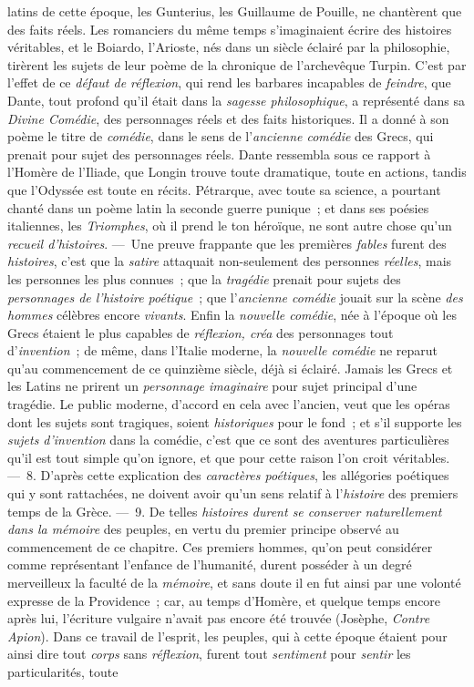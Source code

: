 \documentclass[french,twoside]{book} %
\begin{document}
latins de cette époque, les Gunterius, les  Guillaume de Pouille, ne chantèrent que des faits réels. Les romanciers du même temps s’imaginaient écrire des histoires véritables, et le Boiardo, l’Arioste, nés dans un siècle éclairé par la philosophie, tirèrent les sujets de leur poème de la chronique de l’archevêque Turpin. C’est par l’effet de ce {\itshape défaut de réflexion}, qui rend les barbares incapables de {\itshape feindre}, que Dante, tout profond qu’il était dans la {\itshape sagesse philosophique}, a représenté dans sa {\itshape Divine Comédie}, des personnages réels et des faits historiques. Il a donné à son poème le titre de {\itshape comédie}, dans le sens de l’{\itshape ancienne comédie} des Grecs, qui prenait pour sujet des personnages réels. Dante ressembla sous ce rapport à l’Homère de l’Iliade, que Longin trouve toute dramatique, toute en actions, tandis que l’Odyssée est toute en récits. Pétrarque, avec toute sa science, a pourtant chanté dans un poème latin la seconde guerre punique ; et dans ses poésies italiennes, les {\itshape Triomphes}, où il prend le ton héroïque, ne sont autre chose qu’un {\itshape recueil d’histoires}. — Une preuve frappante que les premières {\itshape fables} furent des {\itshape histoires}, c’est que la {\itshape satire} attaquait non-seulement des personnes {\itshape réelles}, mais les personnes les plus connues ; que la {\itshape tragédie} prenait pour sujets des {\itshape personnages de l’histoire poétique} ; que l’{\itshape ancienne comédie} jouait sur la scène {\itshape des hommes} célèbres encore {\itshape vivants}. Enfin la {\itshape nouvelle comédie}, née à l’époque où les Grecs étaient le plus capables de {\itshape réflexion, créa} des personnages tout d’{\itshape invention} ; de même, dans l’Italie moderne, la  {\itshape nouvelle comédie} ne reparut qu’au commencement de ce quinzième siècle, déjà si éclairé. Jamais les Grecs et les Latins ne prirent un {\itshape personnage imaginaire} pour sujet principal d’une tragédie. Le public moderne, d’accord en cela avec l’ancien, veut que les opéras dont les sujets sont tragiques, soient {\itshape historiques} pour le fond ; et s’il supporte les {\itshape sujets d’invention} dans la comédie, c’est que ce sont des aventures particulières qu’il est tout simple qu’on ignore, et que pour cette raison l’on croit véritables. — 8. D’après cette explication des {\itshape caractères poétiques}, les allégories poétiques qui y sont rattachées, ne doivent avoir qu’un sens relatif à l’{\itshape histoire} des premiers temps de la Grèce. — 9. De telles {\itshape histoires durent se conserver naturellement dans la mémoire} des peuples, en vertu du premier principe observé au commencement de ce chapitre. Ces premiers hommes, qu’on peut considérer comme représentant l’enfance de l’humanité, durent posséder à un degré merveilleux la faculté de la {\itshape mémoire}, et sans doute il en fut ainsi par une volonté expresse de la Providence ; car, au temps d’Homère, et quelque temps encore après lui, l’écriture vulgaire n’avait pas encore été trouvée (Josèphe, {\itshape Contre Apion}). Dans ce travail de l’esprit, les peuples, qui à cette époque étaient pour ainsi dire tout {\itshape corps} sans {\itshape réflexion}, furent tout {\itshape sentiment} pour {\itshape sentir} les particularités, toute 
\end{document}
